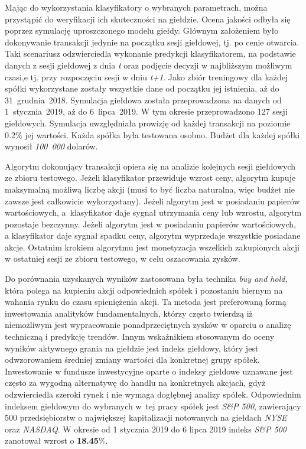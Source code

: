 \documentclass[a4paper, twoside, 11pt, openright]{article}
\begin{document}
Mając do wykorzystania klasyfikatory o wybranych parametrach, można przystąpić do weryfikacji ich skuteczności na giełdzie. Ocena jakości odbyła się poprzez symulację uproszczonego modelu giełdy. Głównym założeniem było dokonywanie transakcji jedynie na początku sesji giełdowej, tj. po cenie otwarcia. Taki scenariusz odzwierciedla wykonanie predykcji klasyfikatorem, na podstawie danych z sesji giełdowej z dnia \textit{t} oraz podjęcie decyzji w najbliższym możliwym czasi,e tj. przy rozpoczęciu sesji w dniu \textit{t+1}. Jako zbiór treningowy dla każdej spółki wykorzystane zostały wszystkie dane od początku jej istnienia, aż do 31~grudnia~2018. Symulacja giełdowa została przeprowadzona na danych od 1~stycznia~2019, aż do 6~lipca~2019. W tym okresie przeprowadzono 127 sesji giełdowych. Symulacja uwzględniała prowizję od każdej transakcji na poziomie 0.2\% jej wartości. Każda spółka była testowana osobno. Budżet dla każdej spółki wynosił \textit{100~000} dolarów.

\bigskip

Algorytm dokonujący transakcji opiera się na analizie kolejnych sesji giełdowych ze zbioru testowego. Jeżeli klasyfikator przewiduje wzrost ceny, algorytm kupuje maksymalną możliwą liczbę akcji (musi to być liczba naturalna, więc budżet nie zawsze jest całkowicie wykorzystany). Jeżeli algorytm jest w posiadaniu papierów wartościowych, a~klasyfikator daje sygnał utrzymania ceny lub wzrostu, algorytm pozostaje bezczynny. Jeżeli algorytm jest w posiadaniu papierów wartościowych, a klasyfikator daje sygnał spadku ceny, algorytm wyprzedaje wszystkie posiadane akcje. Ostatnim krokiem algorytmu jest monetyzacja wszelkich zakupionych akcji w ostatniej sesji ze zbioru testowego, w celu oszacowania zysków.

\bigskip

Do porównania uzyskanych wyników zastosowana była technika \textit{buy and hold}, która polega na kupieniu akcji odpowiednich spółek i pozostaniu biernym na wahania rynku do czasu spieniężenia akcji. Ta metoda jest preferowaną formą inwestowania analityków fundamentalnych, którzy często twierdzą iż niemożliwym jest wypracowanie ponadprzeciętnych zysków w oparciu o analizę techniczną i predykcję trendów. Innym wskaźnikiem stosowanym do oceny wyników aktywnego grania na giełdzie jest indeks giełdowy, który jest odwzorowaniem średniej zmiany wartości dla konkretnej grupy spółek. Inwestowanie w fundusze inwestycyjne oparte o indeksy giełdowe uznawane jest często za wygodną alternatywę do handlu na konkretnych akcjach, gdyż odzwierciedla szeroki rynek i nie wymaga dogłębnej analizy spółek. Odpowiednim indeksem giełdowym do wybranych w~tej pracy spółek jest \textit{S\&P 500}, zawierający 500 przedsiębiorstw o największej kapitalizacji notowanych na giełdach \textit{NYSE} oraz \textit{NASDAQ}. W okresie od 1 stycznia 2019 do 6 lipca 2019 indeks \textit{S\&P 500} zanotował wzrost o \textbf{18.45}\%.
\end{document}
